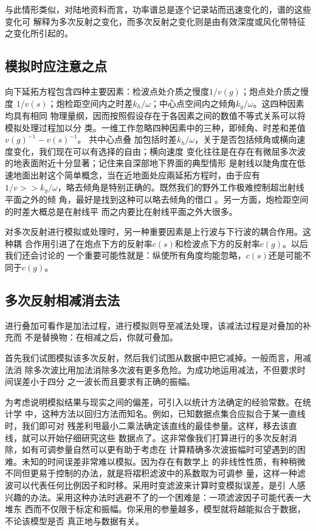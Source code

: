 与此情形类似，对陆地资料而言，功率谱总是逐个记录站而迅速变化的，谱的这些变化可
解释为多次反射之变化，而多次反射之变化则是由有效深度或风化带特征之变化所引起的。

\subsection{模拟时应注意之点}
\label{sec:5.6.3}



向下延拓方程包含四种主要因素：检波点处介质之慢度$1/v(g)$；炮点处介质之慢度
$1/v(s)$；炮检距空间内之时差$k_h/\omega$；中心点空间内之倾角$k_y/\omega$。这四种因素均具有相同
物理量纲，因而按照假设存在于各因素之间的数值不等式关系可以将模拟处理过程加以分
类。一维工作忽略四种因素中的三种，即倾角、时差和差值$v(g)^{-1}-v(s)^{-1}$。
共中心点叠
加包括时差$k_h/\omega$，关于是否包括倾角或横向速度变化，我们现在可以有选择的自由；横向速度
变化往往是在存在有微屈多次波的地表面附近十分显著；记住来自深部地下界面的典型情形
是射线以陡角度在低速地面出射这个简单概念，当在近地面处应兩延拓方程时，由于应有
$1/v>>k_y/\omega$，略去倾角是特别正确的。既然我们的野外工作极难控制超岀射线平面之外的倾
角，最好是找到这种可以略去倾角的借口
。另一方面，炮检距空间的时差大概总是在射线平
而之内要比在射线平面之外大很多。

对多次反射进行模拟或处理时，另一种重要因素是上行波与下行波的耦合作用。这种耦
合作用引进了在炮点下方的反射率$c(s)$和检波点下方的反射率$c(g)$。以后我们还会讨论的
一个重要可能性就是：纵使所有角度均能忽略，$c(s)$还是可能不同于$c(g)$。

\subsection{多次反射相减消去法}
\label{sec:5.6.4}

进行叠加可看作是加法过程，进行模拟则导至减法处理，该减法过程是对叠加的补充而
不是替换物：在相减之后，你就可叠加。

首先我们试图模拟该多次反射，然后我们试图从数据中把它减掉。一般而言，用减法消
除多次波比用加法消除多次波有更多危险。为成功地运用减法，不但要求时间误差小于四分
之一波长而且要求有正确的振幅。

为考虑说明模拟结果与现实之间的偏差，可引入以统计方法确定的经验常数。在统计学
中，这种方法以回归方法而知名。例如，已知数据点集合应拟合于某一直线时，我们即可对
残差利甩最小二乘法确定该直线的最佳参量。这样，移去该直线，就可以开始仔细研究这些
数据点了。这非常像我们打算进行的多次反射消除，如有可调参量自然可以更有助于考虑在
计算精确多次波振幅时可望遇到的困难。未知的时间误差非常难以模拟。因为存在有数学上
的非线性性质，有种稍微不同但更易于控制的办法，就是将褶积滤波中的系数取为可调参
量，这样一种滤波可以代表任何比例因子和时移。采用时变滤波来计算时变模拟误差，是引
人感兴趣的办法。采用这种办法时逃避不了的一个困难是：一项滤波因子可能代表一大堆东
西而不仅限于标定和振幅。你采用的参量越多，模型就将越能拟合于数据，不论该模型是否
真正地与数据有关。

